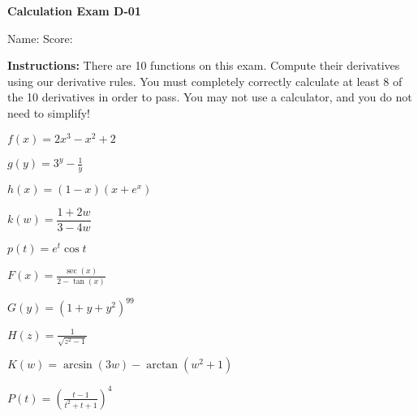 \documentclass[10pt,answers,addpoints]{exam}
\begin{document}



{\bfseries\large Calculation Exam D-01}
{}%

Name: \makebox[4.18in]{\hrulefill} \quad Score: \makebox[0.75in]{\hrulefill} %


\vspace{0.2in}

\textbf{Instructions: } There are 10 functions on this exam. Compute their derivatives using our derivative rules. You must completely correctly calculate at least 8 of the 10 derivatives in order to pass. You may not use a calculator, and you do not need to simplify! 




\begin{questions}

\question $f(x)=2x^3 - x^2 + 2$

\vfill

\question $g(y) = 3^y - \frac{1}{y}$

\vfill

\question $h(x) = (1-x)(x+e^x)$

\vfill


\question $k(w) = \dfrac{1+2w}{3-4w}$

\vfill

\question $p(t) = e^t \cos t $

\vfill

\newpage


\question $F(x) = \frac{\sec(x)}{2-\tan(x)}$

\vfill


\question $G(y) = (1+y+y^2)^{99}$

\vfill

\question $H(z) = \frac{1}{\sqrt{z^2-1}}$

\vfill

\question $K(w) = \arcsin(3w)-\arctan(w^2+1)$

\vfill

\question $P(t) = \left(\frac{t-1}{t^2+t+1}\right)^4$

\vfill

\thispagestyle{empty}

\end{questions}
\end{document}
